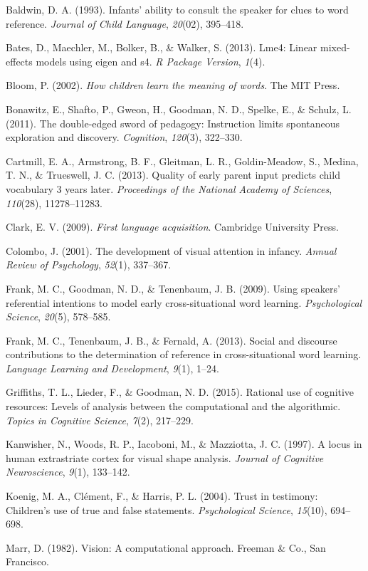 \documentclass[12pt,]{article}
\begin{document}
Baldwin, D. A. (1993). Infants' ability to consult the speaker for clues
to word reference. \emph{Journal of Child Language}, \emph{20}(02),
395--418.

Bates, D., Maechler, M., Bolker, B., \& Walker, S. (2013). Lme4: Linear
mixed-effects models using eigen and s4. \emph{R Package Version},
\emph{1}(4).

Bloom, P. (2002). \emph{How children learn the meaning of words}. The
MIT Press.

Bonawitz, E., Shafto, P., Gweon, H., Goodman, N. D., Spelke, E., \&
Schulz, L. (2011). The double-edged sword of pedagogy: Instruction
limits spontaneous exploration and discovery. \emph{Cognition},
\emph{120}(3), 322--330.

Cartmill, E. A., Armstrong, B. F., Gleitman, L. R., Goldin-Meadow, S.,
Medina, T. N., \& Trueswell, J. C. (2013). Quality of early parent input
predicts child vocabulary 3 years later. \emph{Proceedings of the
National Academy of Sciences}, \emph{110}(28), 11278--11283.

Clark, E. V. (2009). \emph{First language acquisition}. Cambridge
University Press.

Colombo, J. (2001). The development of visual attention in infancy.
\emph{Annual Review of Psychology}, \emph{52}(1), 337--367.

Frank, M. C., Goodman, N. D., \& Tenenbaum, J. B. (2009). Using
speakers' referential intentions to model early cross-situational word
learning. \emph{Psychological Science}, \emph{20}(5), 578--585.

Frank, M. C., Tenenbaum, J. B., \& Fernald, A. (2013). Social and
discourse contributions to the determination of reference in
cross-situational word learning. \emph{Language Learning and
Development}, \emph{9}(1), 1--24.

Griffiths, T. L., Lieder, F., \& Goodman, N. D. (2015). Rational use of
cognitive resources: Levels of analysis between the computational and
the algorithmic. \emph{Topics in Cognitive Science}, \emph{7}(2),
217--229.

Kanwisher, N., Woods, R. P., Iacoboni, M., \& Mazziotta, J. C. (1997). A
locus in human extrastriate cortex for visual shape analysis.
\emph{Journal of Cognitive Neuroscience}, \emph{9}(1), 133--142.

Koenig, M. A., Cl{é}ment, F., \& Harris, P. L. (2004). Trust in
testimony: Children's use of true and false statements.
\emph{Psychological Science}, \emph{15}(10), 694--698.

Marr, D. (1982). Vision: A computational approach. Freeman \& Co., San
Francisco.
\end{document}
